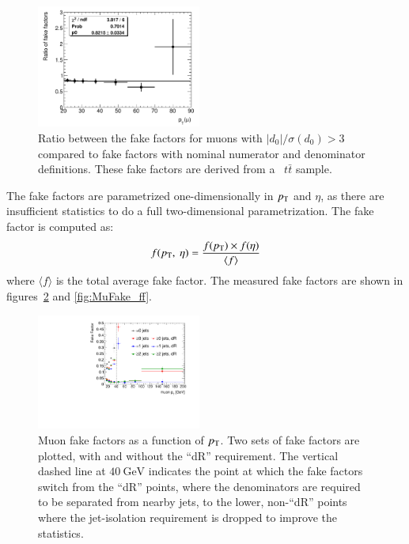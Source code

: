 \begin{figure}[h]
\centering \includegraphics[width=0.48\textwidth]{figures/backgrounds/MuFake_extrap_ratio}
\caption{\label{fig:MuFake_extrap}Ratio between the fake factors for muons with $|d_0|/\sigma(d_0)>3$ compared to fake factors with nominal numerator and denominator definitions.  These fake factors are derived from a \powheg\ $t\bar{t}$ sample.}
\end{figure}

The fake factors are parametrized one-dimensionally in $p_{\text{T}}$ and $\eta$, as there are insufficient statistics to do a full two-dimensional parametrization. The fake factor is computed as:
\begin{equation}
f(\pt,\ \eta) = \frac{f(\pt)\times f(\eta)}{\langle f \rangle}
\end{equation}
where $\langle f \rangle$ is the total average fake factor. The measured fake factors are shown in figures~\ref{fig:MuFake_ff_1D} and \ref{fig:MuFake_ff}. 

\begin{figure}
\centering \includegraphics[width=0.48\textwidth]{figures/backgrounds/all_1D_pt}
\caption{\label{fig:MuFake_ff_1D}Muon fake factors as a function of $p_{\text{T}}$. Two sets of fake factors are plotted, with and without the ``dR'' requirement. The vertical dashed line at $\SI{40}{\giga\electronvolt}$ indicates the point at which the fake factors switch from the ``dR'' points, where the denominators are required to be separated from nearby jets, to the lower, non-``dR'' points where the jet-isolation requirement is dropped to improve the statistics.}
\end{figure}

